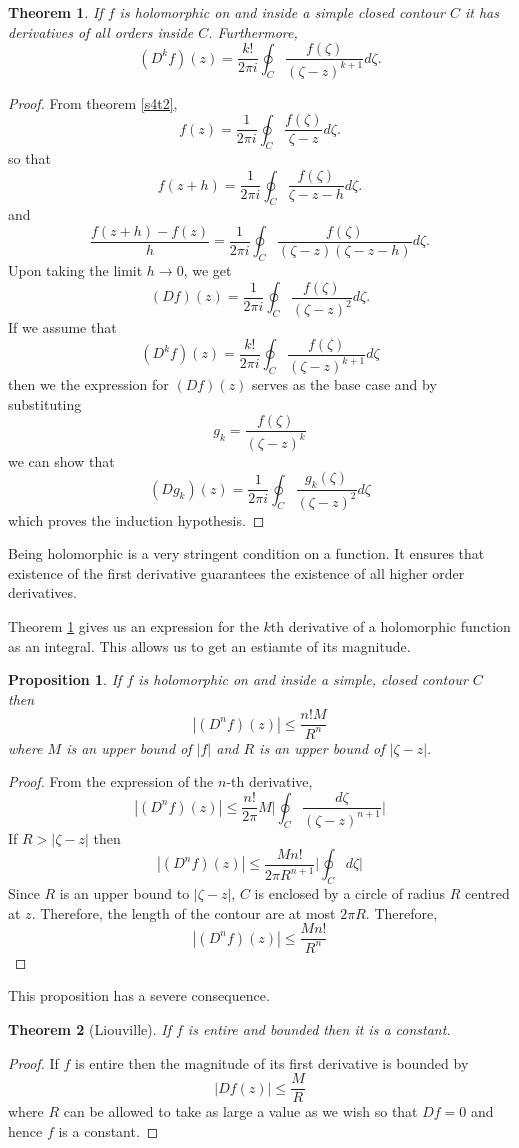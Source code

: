 \documentclass{article}
\theoremstyle{plain}
\newtheorem{thm}{Theorem}
\numberwithin{thm}{section}
\theoremstyle{plain}
\newtheorem{prop}{Proposition}
\numberwithin{prop}{section}
\theoremstyle{plain}
\numberwithin{prop}{section}
\theoremstyle{definition}
\numberwithin{defn}{section}
\theoremstyle{remark}
\numberwithin{equation}{section}
\begin{document}
\begin{thm}\label{s4t3}
If $f$ is holomorphic on and inside a simple closed contour $C$ it has 
derivatives of all orders inside $C$. Furthermore,
\[
(D^k f)(z) = \frac{k!}{2\pi i}\oint_C\frac{f(\zeta)}{(\zeta - z)^{k+1}}d\zeta.
\]
\end{thm}
\begin{proof}
From theorem \ref{s4t2},
\[
f(z) = \frac{1}{2\pi i}\oint_C \frac{f(\zeta)}{\zeta - z}d\zeta.
\]
so that
\[
f(z + h) = \frac{1}{2\pi i}\oint_C \frac{f(\zeta)}{\zeta - z - h}d\zeta.
\]
and
\[
\frac{f(z + h) - f(z)}{h} = \frac{1}{2\pi i}\oint_C \frac{f(\zeta)}{(\zeta - z)
(\zeta - z - h)} d\zeta.
\]
Upon taking the limit $h \rightarrow 0$, we get
\[
(Df)(z) = \frac{1}{2\pi i}\oint_C \frac{f(\zeta)}{(\zeta - z)^2}d\zeta.
\]
If we assume that
\[
(D^k f)(z) = \frac{k!}{2\pi i}\oint_C \frac{f(\zeta)}{(\zeta - z)^{k+1}}d\zeta
\]
then we the expression for $(Df)(z)$ serves as the base case and by substituting
\[
g_k = \frac{f(\zeta)}{(\zeta - z)^k}
\]
we can show that
\[
(Dg_k)(z) = \frac{1}{2\pi i}\oint_C \frac{g_k(\zeta)}{(\zeta - z)^2}d\zeta
\]
which proves the induction hypothesis. 
\end{proof}

Being holomorphic is a very stringent condition on a function. It ensures that
existence of the first derivative guarantees the existence of all higher order
derivatives.

Theorem \ref{s4t3} gives us an expression for the $k$th derivative of a 
holomorphic function as an integral. This allows us to get an estiamte of its
magnitude.
\begin{prop}\label{s4p2}
If $f$ is holomorphic on and inside a simple, closed contour $C$ then
\[
|(D^n f)(z)| \le \frac{n! M}{R^n}
\]
where $M$ is an upper bound of $|f|$ and $R$ is an upper bound of $|\zeta - z|$.
\end{prop}
\begin{proof}
From the expression of the $n$-th derivative,
\[
|(D^n f)(z)| \le 
\frac{n!}{2\pi}M\Big|\oint_C\frac{d\zeta}{(\zeta - z)^{n+1}}\Big|
\]
If $R > |\zeta - z|$ then
\[
|(D^n f)(z)| \le \frac{Mn!}{2\pi R^{n+1}}\Big|\oint_C d\zeta\Big|
\]
Since $R$ is an upper bound to $|\zeta - z|$, $C$ is enclosed by a circle of
radius $R$ centred at $z$. Therefore, the length of the contour are at most
$2\pi R$. Therefore,
\[
|(D^n f)(z)| \le \frac{Mn!}{R^n}
\]
\end{proof}

This proposition has a severe consequence.
\begin{thm}[Liouville]\label{s4t4}
If $f$ is entire and bounded then it is a constant.
\end{thm}
\begin{proof}
If $f$ is entire then the magnitude of its first derivative is bounded by
\[
|Df(z)| \le \frac{M}{R}
\]
where $R$ can be allowed to take as large a value as we wish so that $Df = 0$
and hence $f$ is a constant.
\end{proof}
\end{document}
